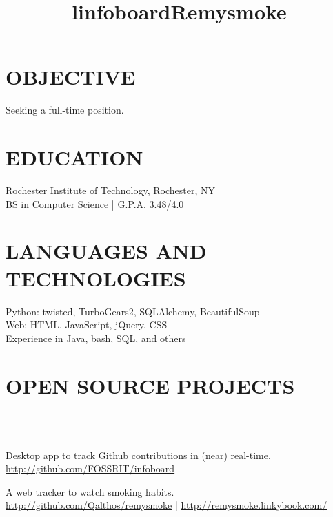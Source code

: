 \documentclass[linemargin]{res}
\begin{document}

\begin{resume}

\section{OBJECTIVE}
    Seeking a full-time position.

\section{EDUCATION}
    Rochester Institute of Technology, Rochester, NY \\
    BS in Computer Science | G.P.A. 3.48/4.0

\section{LANGUAGES AND TECHNOLOGIES}
    Python: twisted, TurboGears2, SQLAlchemy, BeautifulSoup\\
    Web: HTML, JavaScript, jQuery, CSS\\
    Experience in Java, bash, SQL, and others

\section{OPEN SOURCE PROJECTS}
    \begin{format}
        \title{l}\\
        \\
        \body
    \end{format}

    \title{infoboard}
    \employer{}
    \begin{position}
        Desktop app to track Github contributions in (near) real-time.\\
        \url{http://github.com/FOSSRIT/infoboard}
    \end{position}

    \title{Remysmoke}
    \begin{position}
        A web tracker to watch smoking habits.\\
        \url{http://github.com/Qalthos/remysmoke} | \url{http://remysmoke.linkybook.com/}
    \end{position}


\end{resume}
\end{document}
